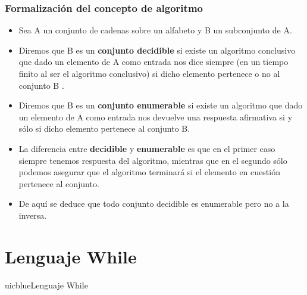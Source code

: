 \documentclass[xcolor=table]{beamer}
\begin{document}
\begin{frame}[fragile]\frametitle{Formalización del concepto de algoritmo} \small

\begin{itemize}
    \item Sea A un conjunto de cadenas sobre un alfabeto y B un subconjunto de A.

    \item Diremos que B es un \textbf{conjunto decidible} si existe un algoritmo conclusivo que dado un elemento de A como entrada nos dice siempre (en un tiempo finito al ser el algoritmo conclusivo) si dicho elemento pertenece o no al conjunto B .

    \item Diremos que B es un \textbf{conjunto enumerable} si existe un algoritmo que dado un elemento de A como entrada nos devuelve una respuesta afirmativa si y sólo si dicho elemento pertenece al conjunto B.

    \item La diferencia entre \textbf{decidible} y \textbf{enumerable} es que en el primer caso siempre tenemos respuesta del algoritmo, mientras que en el segundo sólo podemos asegurar que el algoritmo terminará si el elemento en cuestión pertenece al conjunto.

    \item De aquí se deduce que todo conjunto decidible es enumerable pero no a la inversa.
\end{itemize}

\end{frame}





\section{Lenguaje While}

\begin{chapter}{uicblue}{Lenguaje While}
\end{chapter}


\end{document}
